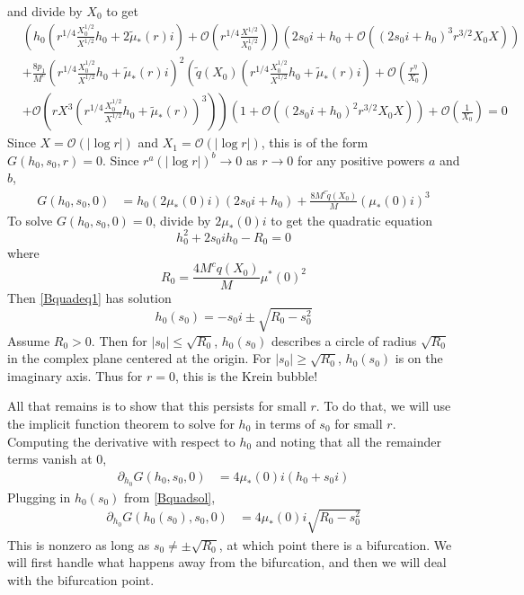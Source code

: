 \documentclass[thesis.tex]{subfiles}
\begin{document}
and divide by $X_0$ to get
\begin{equation*}
\begin{aligned}
&\left( h_0 \left( r^{1/4}\frac{X_0^{1/2}}{X^{1/2}} h_0 + 2 \tilde{\mu}_*(r) i\right) + \mathcal{O}\left( r^{1/4} \frac{X^{1/2}}{X_0^{1/2}} \right) \right) 
\left( 2 s_0 i + h_0 + \mathcal{O}\left( \left( 2 s_0 i + h_0 \right)^3 r^{3/2} X_0 X \right) \right) \\
&+\frac{8 p_1}{M^c} \left( r^{1/4}\frac{X_0^{1/2}}{X^{1/2}} h_0 + \tilde{\mu}_*(r) i\right)^2 \left( \tilde{q}(X_0) \left(r^{1/4}\frac{X_0^{1/2}}{X^{1/2}} h_0 + \tilde{\mu}_*(r)i \right) + \mathcal{O}\left(\frac{r^{\eta}}{X_0} \right) \right.\\
&+ \left. \mathcal{O} \left (r X^3 \left(r^{1/4} \frac{X_0^{1/2}}{X^{1/2}} h_0 + \tilde{\mu}_*(r)\right)^3 \right) \right) \left( 1 + \mathcal{O}\left( \left(2 s_0 i + h_0\right)^2 r^{3/2} X_0 X \right) \right) + \mathcal{O}\left(\frac{1}{X_0}\right) = 0
\end{aligned}
\end{equation*}
Since $X = \mathcal{O}(|\log r|)$ and $X_1 = \mathcal{O}(|\log r|)$, this is of the form $G(h_0, s_0, r) = 0$. Since $r^{a}(|\log r|)^b \rightarrow 0$ as $r \rightarrow 0$ for any positive powers $a$ and $b$, 
\begin{equation}\label{BsimpleG0}
\begin{aligned}
G(h_0, s_0, 0) &= h_0 (2 \mu_*(0) i)(2 s_0 i + h_0) + \frac{8 M^c \tilde{q}(X_0)}{M}(\mu_*(0) i)^3 
\end{aligned}
\end{equation}
To solve $G(h_0, s_0, 0) = 0$, divide by $2 \mu_*(0) i$ to get the quadratic equation
\begin{equation}\label{Bquadeq1}
h_0^2 + 2 s_0 i h_0 - R_0 = 0
\end{equation}
where 
\[
R_0 = \frac{4 M^c q(X_0)}{M}\mu^*(0)^2
\]
Then \cref{Bquadeq1} has solution
\begin{equation}\label{Bquadsol}
h_0(s_0) = -s_0 i \pm \sqrt{ R_0 - s_0^2 }
\end{equation}
Assume $R_0 > 0$. Then for $|s_0| \leq \sqrt{R_0}$, $h_0(s_0)$ describes a circle of radius $\sqrt{R_0}$ in the complex plane centered at the origin. For $|s_0| \geq \sqrt{R_0}$, $h_0(s_0)$ is on the imaginary axis. Thus for $r = 0$, this is the Krein bubble!

All that remains is to show that this persists for small $r$. To do that, we will use the implicit function theorem to solve for $h_0$ in terms of $s_0$ for small $r$. Computing the derivative with respect to $h_0$ and noting that all the remainder terms vanish at 0,
\begin{align*}
\partial_{h_0} G(h_0, s_0, 0) 
&= 4\mu_*(0) i ( h_0 + s_0 i )
\end{align*}
Plugging in $h_0(s_0)$ from \cref{Bquadsol},
\begin{align*}
\partial_{h_0} G(h_0(s_0), s_0, 0) 
&= 4\mu_*(0) i \sqrt{ R_0 - s_0^2 }
\end{align*}
This is nonzero as long as $s_0 \neq \pm \sqrt{R_0}$, at which point there is a bifurcation. We will first handle what happens away from the bifurcation, and then we will deal with the bifurcation point.
\end{document}
